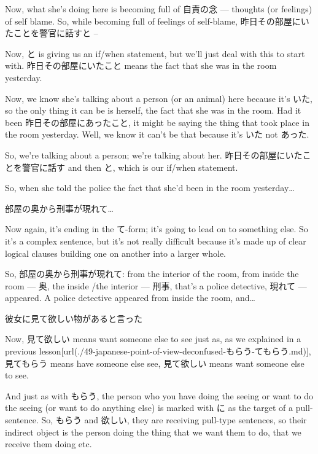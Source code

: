 Now, what she's doing here is becoming full of 自責の念 --- thoughts (or feelings) of self blame. So, while becoming full of feelings of self-blame, 昨日その部屋にいたことを警官に話すと --

{}

Now, と is giving us an if/when statement, but we'll just deal with this to start with. 昨日その部屋にいたこと means the fact that she was in the room yesterday.

Now, we know she's talking about a person (or an animal) here because it's いた, so the only thing it can be is herself, the fact that she was in the room. Had it been 昨日その部屋にあったこと, it might be saying the thing that took place in the room yesterday. Well, we know it can't be that because it's いた not あった.

So, we're talking about a person; we're talking about her. 昨日その部屋にいたことを警官に話す and then と, which is our if/when statement.

So, when she told the police the fact that she'd been in the room yesterday\ldots{}

部屋の奥から刑事が現れて\ldots{}

{}

Now again, it's ending in the て-form; it's going to lead on to something else. So it's a complex sentence, but it's not really difficult because it's made up of clear logical clauses building one on another into a larger whole.

So, 部屋の奥から刑事が現れて: from the interior of the room, from inside the room --- 奥, the inside /the interior --- 刑事, that's a police detective, 現れて --- appeared. A police detective appeared from inside the room, and\ldots{}

彼女に見て欲しい物があると言った

{}

Now, 見て欲しい means want someone else to see just as, as we explained in a previous lesson\goto{{[}49{]}}[url(./49-japanese-point-of-view-deconfused-もらう-てもらう.md)], 見てもらう means have someone else see, 見て欲しい means want someone else to see.

And just as with もらう, the person who you have doing the seeing or want to do the seeing (or want to do anything else) is marked with に as the target of a pull-sentence. So, もらう and 欲しい, they are receiving pull-type sentences, so their indirect object is the person doing the thing that we want them to do, that we receive them doing etc.

